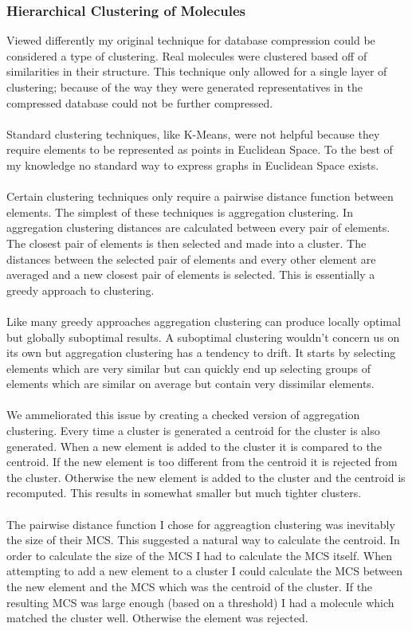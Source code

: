 \documentclass[DIV=calc, paper=a4, fontsize=12pt, twocolumn]{scrartcl}	 %
\begin{document}
\subsubsection*{Hierarchical Clustering of Molecules}
Viewed differently my original technique for database compression could be considered a type of clustering. Real molecules were clustered based off of similarities in their structure. This technique only allowed for a single layer of clustering; because of the way they were generated representatives in the compressed database could not be further compressed. 
\\\\
Standard clustering techniques, like K-Means, were not helpful because they require elements to be represented as points in Euclidean Space. To the best of my knowledge no standard way to express graphs in Euclidean Space exists. 
\\\\
Certain clustering techniques only require a pairwise distance function between elements. The simplest of these techniques is aggregation clustering. In aggregation clustering distances are calculated between every pair of elements. The closest pair of elements is then selected and made into a cluster. The distances between the selected pair of elements and every other element are averaged and a new closest pair of elements is selected. This is essentially a greedy approach to clustering.
\\\\
Like many greedy approaches aggregation clustering can produce locally optimal but globally suboptimal results. A suboptimal clustering wouldn't concern us on its own but aggregation clustering has a tendency to drift. It starts by selecting elements which are very similar but can quickly end up selecting groups of elements which are similar on average but contain very dissimilar elements.
\\\\
We ammeliorated this issue by creating a checked version of aggregation clustering. Every time a cluster is generated a centroid for the cluster is also generated. When a new element is added to the cluster it is compared to the centroid. If the new element is too different from the centroid it is rejected from the cluster. Otherwise the new element is added to the cluster and the centroid is recomputed. This results in somewhat smaller but much tighter clusters.
\\\\
The pairwise distance function I chose for aggreagtion clustering was inevitably the size of their MCS. This suggested a natural way to calculate the centroid. In order to calculate the size of the MCS I had to calculate the MCS itself. When attempting to add a new element to a cluster I could calculate the MCS between the new element and the MCS which was the centroid of the cluster. If the resulting MCS was large enough (based on a threshold) I had a molecule which matched the cluster well. Otherwise the element was rejected.
\end{document}
